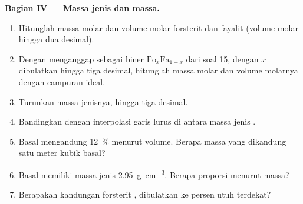 \begin{problem}
\medskip
\noindent\textbf{Bagian IV --- Massa jenis dan massa.}
\begin{enumerate}[resume]
  \item Hitunglah massa molar dan volume molar forsterit dan fayalit (volume molar hingga dua desimal).
  \item Dengan menganggap  sebagai biner $\mathrm{Fo}_x\mathrm{Fa}_{1-x}$ dari soal 15, dengan $x$ dibulatkan hingga tiga desimal, hitunglah massa molar dan volume molarnya dengan campuran ideal.
  \item Turunkan massa jenisnya, hingga tiga desimal.
  \item Bandingkan dengan interpolasi garis lurus di antara massa jenis .
  \item Basal mengandung \qty{12}{\percent}  menurut volume. Berapa massa  yang dikandung satu meter kubik basal?
  \item Basal memiliki massa jenis \qty{2.95}{g.cm^{-3}}. Berapa proporsi  menurut massa?
  \item Berapakah kandungan forsterit , dibulatkan ke persen utuh terdekat?
\end{enumerate}
\end{problem}
